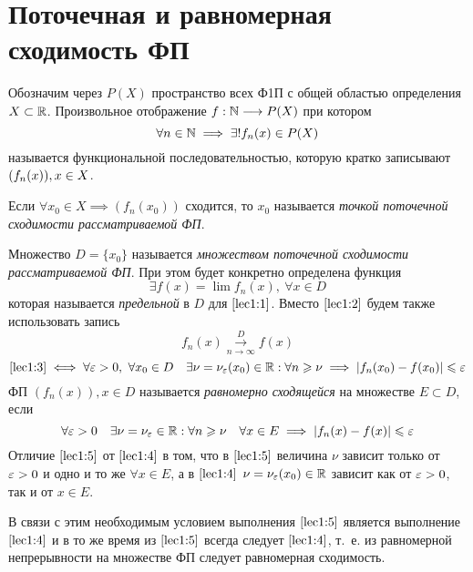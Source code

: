 \documentclass[../../main.tex]{subfiles}
\begin{document}
\section{Поточечная и равномерная сходимость ФП}
Обозначим через $P(X)$ пространство всех Ф1П 
с общей областью определения $X \subset \mathbb{R}$.
Произвольное отображение $f: \mathbb{N} \longrightarrow P(X)$ при котором 
\begin{equation}
\label{lec1:1}
\forall n \in \mathbb{N} \implies \exists! f_n(x) \in P(X)
\end{equation}
называется функциональной последовательностью, 
которую кратко записывают $(f_n(x)),\\ x\in X$.

Если $\forall x_0 \in X \implies (f_n(x_0))$ сходится, то $x_0$ называется
\emph{точкой поточечной сходимости рассматриваемой ФП}.

Множество $D = \{x_0\}$ называется \emph{множеством поточечной сходимости
рассматриваемой ФП}.
При этом будет конкретно определена функция 
\begin{equation}
\label{lec1:2}
\exists f(x) = \lim f_n(x),\ \forall x \in D
\end{equation}
которая называется \emph{предельной} в $D$ для $\eqref{lec1:1}$.
Вместо $\eqref{lec1:2}$ будем также использовать запись 
\begin{equation}
\label{lec1:3}
f_n(x) \overset{D}{\underset{n \to \infty}\longrightarrow} f(x)
\end{equation}
\begin{equation}
\label{lec1:4}
\eqref{lec1:3} \iff \forall \varepsilon > 0,\ \forall x_0 \in D \quad 
\exists \nu = \nu_\varepsilon(x_0) \in \mathbb{R} : \forall n \geqslant \nu \implies
|f_n(x_0) - f(x_0)| \leqslant \varepsilon
\end{equation}
ФП $(f_n(x)), x \in D$ называется \emph{равномерно сходящейся} 
на множестве $E \subset D$, если 
\begin{equation}
\label{lec1:5}
\forall \varepsilon > 0 \quad
\exists \nu = \nu_\varepsilon \in \mathbb{R} : 
\forall n \geqslant \nu \quad
\forall x \in E \implies 
|f_n(x) - f(x)| \leqslant \varepsilon
\end{equation}
Отличие $\eqref{lec1:5}$ от $\eqref{lec1:4}$ в том, что  в $\eqref{lec1:5}$
величина $\nu$ зависит только от $\varepsilon > 0$ и одно и то же $\forall x \in E$,
а в $\eqref{lec1:4}$ $\nu = \nu_\varepsilon(x_0) \in \mathbb{R}$ зависит как от $\varepsilon > 0$,
так и от $x \in E$.

В связи с этим необходимым условием выполнения $\eqref{lec1:5}$ 
является выполнение $\eqref{lec1:4}$ и в то же время из $\eqref{lec1:5}$
всегда следует $\eqref{lec1:4}$, т.~е. из равномерной непрерывности на 
множестве ФП следует равномерная сходимость.
\end{document}
